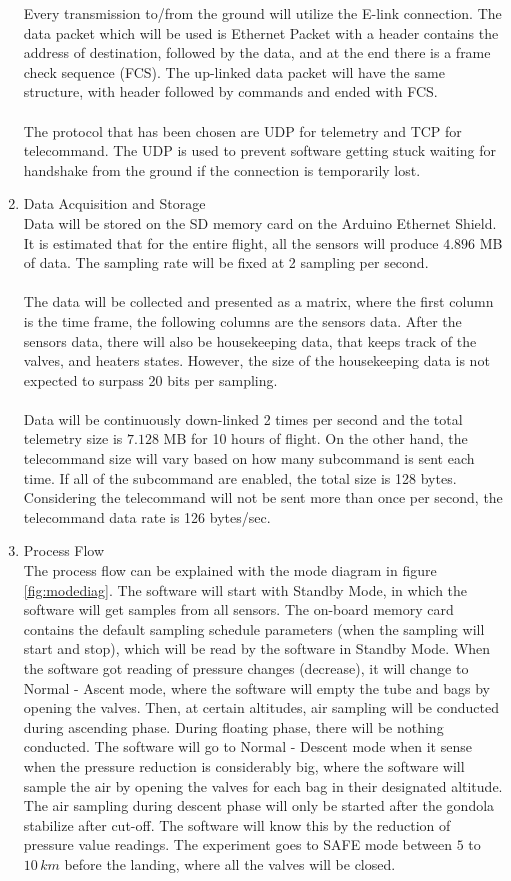 \begin{enumerate}[label=(\alph*)]


Every transmission to/from the ground will utilize the E-link connection. The data packet which will be used is Ethernet Packet with a header contains the address of destination, followed by the data, and at the end there is a frame check sequence (FCS). The up-linked data packet will have the same structure, with header followed by commands and ended with FCS.\\
\\
The protocol that has been chosen are UDP for telemetry and TCP for telecommand. The UDP is used to prevent software getting stuck waiting for handshake from the ground if the connection is temporarily lost.
\item{Data Acquisition and Storage}\\
Data will be stored on the SD memory card on the Arduino Ethernet Shield. It is estimated that for the entire flight, all the sensors will produce $4.896$ MB of data. The sampling rate will be fixed at 2 sampling per second.\\
\\
The data will be collected and presented as a matrix, where the first column is the time frame, the following columns are the sensors data. After the sensors data, there will also be housekeeping data, that keeps track of the valves, and heaters states. However, the size of the housekeeping data is not expected to surpass 20 bits per sampling.\\
\\
Data will be continuously down-linked 2 times per second and the total telemetry size is $7.128$ MB for 10 hours of flight. On the other hand, the telecommand size will vary based on how many subcommand is sent each time. If all of the subcommand are enabled, the total size is 128 bytes. Considering the telecommand will not be sent more than once per second, the telecommand data rate is 126 bytes/sec.
\item{Process Flow}\\
The process flow can be explained with the mode diagram in figure \ref{fig:modediag}. The software will start with Standby Mode, in which the software will get samples from all sensors. The on-board memory card contains the default sampling schedule parameters (when the sampling will start and stop), which will be read by the software in Standby Mode. When the software got reading of pressure changes (decrease), it will change to Normal - Ascent mode, where the software will empty the tube and bags by opening the valves. Then, at certain altitudes, air sampling will be conducted during ascending phase. During floating phase, there will be nothing conducted. The software will go to Normal - Descent mode when it sense when the pressure reduction is considerably big, where the software will sample the air by opening the valves for each bag in their designated altitude. The air sampling during descent phase will only be started after the gondola stabilize after cut-off. The software will know this by the reduction of pressure value readings. The experiment goes to SAFE mode between $5$ to $10 \, km$ before the landing, where all the valves will be closed. 

\end{enumerate}
